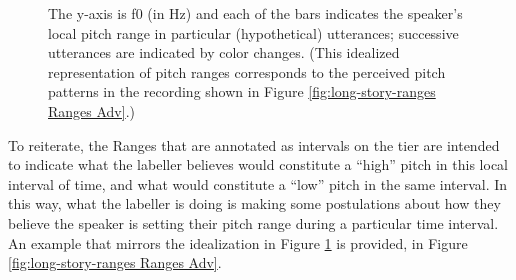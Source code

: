 \documentclass[11pt, twoside]{memoir}
\begin{document}
\begin{figure}[H]
\centering
{}
\caption[An idealization of pitch ranges in four hypothetical utterances.]{The y-axis is f0 (in Hz) and each of the bars indicates the speaker’s local pitch range in particular (hypothetical) utterances; successive utterances are indicated by color changes. (This idealized representation of pitch ranges corresponds to the perceived pitch patterns in the recording shown in Figure \ref{fig:long-story-ranges Ranges Adv}.)%
\label{fig:Ranges bars}%
}
\end{figure}


To reiterate, the Ranges that are annotated as intervals on the tier are intended to indicate what the labeller believes would constitute a “high” pitch in this local interval of time, and what would constitute a “low” pitch in the same interval. In this way, what the labeller is doing is making some postulations about how they believe the speaker is setting their pitch range during a particular time interval. An example that mirrors the idealization in Figure \ref{fig:Ranges bars} is provided, in Figure \ref{fig:long-story-ranges Ranges Adv}.
\end{document}
